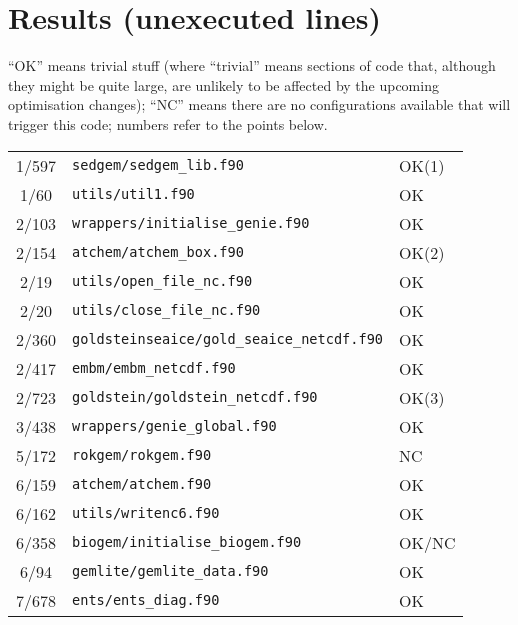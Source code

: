 \documentclass[a4paper,10pt,article]{memoir}
\begin{document}
\section{Results (unexecuted lines)}

``OK'' means trivial stuff (where ``trivial'' means sections of code
that, although they might be quite large, are unlikely to be affected
by the upcoming optimisation changes); ``NC'' means there are no
configurations available that will trigger this code; numbers refer to
the points below.

\begin{center}
\begin{tabular}{cll}
  1/597  & \texttt{sedgem/sedgem\_lib.f90}                           & OK(1) \\
  1/60   & \texttt{utils/util1.f90}                                  & OK \\
  2/103  & \texttt{wrappers/initialise\_genie.f90}                   & OK \\
  2/154  & \texttt{atchem/atchem\_box.f90}                           & OK(2) \\
  2/19   & \texttt{utils/open\_file\_nc.f90}                         & OK \\
  2/20   & \texttt{utils/close\_file\_nc.f90}                        & OK \\
  2/360  & \texttt{goldsteinseaice/gold\_seaice\_netcdf.f90}         & OK \\
  2/417  & \texttt{embm/embm\_netcdf.f90}                            & OK \\
  2/723  & \texttt{goldstein/goldstein\_netcdf.f90}                  & OK(3) \\
  3/438  & \texttt{wrappers/genie\_global.f90}                       & OK \\
  5/172  & \texttt{rokgem/rokgem.f90}                                & NC \\
  6/159  & \texttt{atchem/atchem.f90}                                & OK \\
  6/162  & \texttt{utils/writenc6.f90}                               & OK \\
  6/358  & \texttt{biogem/initialise\_biogem.f90}                    & OK/NC \\
  6/94   & \texttt{gemlite/gemlite\_data.f90}                        & OK \\
  7/678  & \texttt{ents/ents\_diag.f90}                              & OK \\

\end{tabular}
\end{center}
\end{document}
